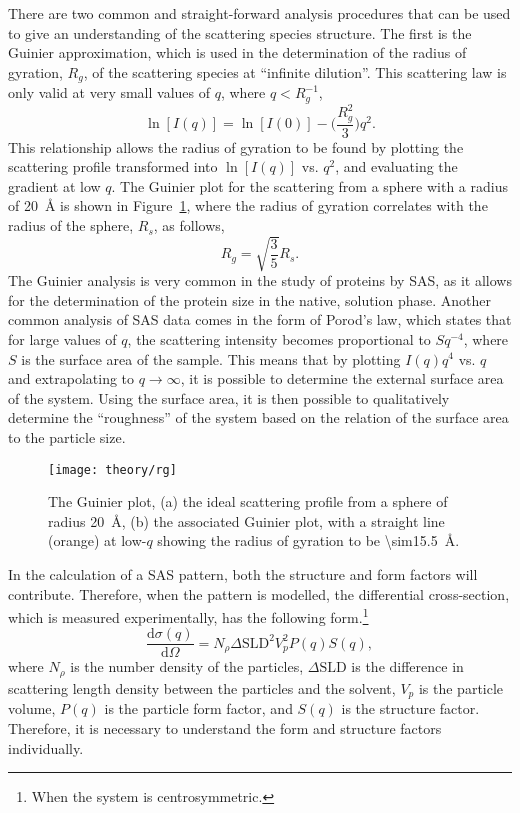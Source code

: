 There are two common and straight-forward analysis procedures that can be used to give an understanding of the scattering species structure.
The first is the Guinier approximation, which is used in the determination of the radius of gyration, $R_g$, of the scattering species at ``infinite dilution''.
This scattering law is only valid at very small values of $q$, where $q < R_g^{-1}$,
%
\begin{equation}
    \ln[I(q)] = \ln[I(0)] - \Bigg(\frac{R_g^2}{3}\Bigg)q^2.
\end{equation}
%
This relationship allows the radius of gyration to be found by plotting the scattering profile transformed into $\ln[I(q)]$ vs. $q^2$, and evaluating the gradient at low $q$.
The Guinier plot for the scattering from a sphere with a radius of \SI{20}{\angstrom} is shown in Figure~\ref{fig:rg}, where the radius of gyration correlates with the radius of the sphere, $R_s$, as follows,
%
\begin{equation}
    R_g = \sqrt{\frac{3}{5}}R_s.
\end{equation}
%
The Guinier analysis is very common in the study of proteins by SAS, as it allows for the determination of the protein size in the native, solution phase.
Another common analysis of SAS data comes in the form of Porod's law, which states that for large values of $q$, the scattering intensity becomes proportional to $Sq^{-4}$, where $S$ is the surface area of the sample.
This means that by plotting $I(q)q^4$ vs. $q$ and extrapolating to $q \rightarrow \infty$, it is possible to determine the external surface area of the system.
Using the surface area, it is then possible to qualitatively determine the ``roughness'' of the system based on the relation of the surface area to the particle size.
%
\begin{figure}[t]
    \centering
    \texttt{[image: theory/rg]}
    \caption{The Guinier plot, (a) the ideal scattering profile from a sphere of radius \SI{20}{\angstrom}, (b) the associated Guinier plot, with a straight line (orange) at low-$q$ showing the radius of gyration to be \SI{\sim15.5}{\angstrom}.}
    \label{fig:rg}
\end{figure}
%

In the calculation of a SAS pattern, both the structure and form factors will contribute.
Therefore, when the pattern is modelled, the differential cross-section, which is measured experimentally, has the following form.\footnote{When the system is centrosymmetric.}
%
\begin{equation}
    \frac{\text{d}\sigma(q)}{\text{d}\Omega} = N_\rho\Delta\text{SLD}^2V_p^2 P(q)S(q),
\end{equation}
%
where $N_\rho$ is the number density of the particles, $\Delta\text{SLD}$ is the difference in scattering length density between the particles and the solvent, $V_p$ is the particle volume, $P(q)$ is the particle form factor, and $S(q)$ is the structure factor.
Therefore, it is necessary to understand the form and structure factors individually.

